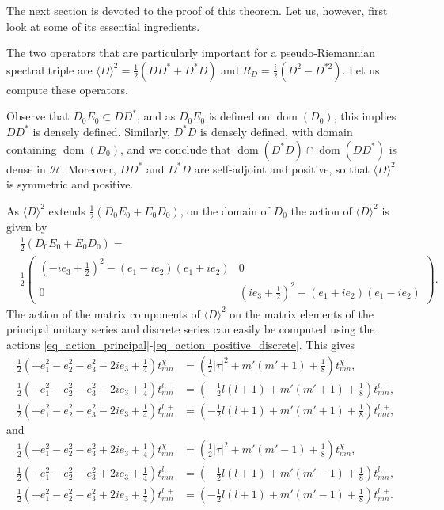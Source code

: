 \documentclass{amsart}
\theoremstyle{definition}
\theoremstyle{remark}
\DeclareMathOperator{\dom}{dom}
\numberwithin{equation}{section}
\begin{document}
The next section is devoted to the proof of this theorem. Let us, however, first look at some of its essential ingredients.

The two operators that are particularly important for a pseudo-Riemannian spectral triple are $\langle D\rangle^2=\tfrac{1}{2}(DD^*+D^*D)$ and $R_D=\tfrac{i}{2}(D^2-D^{*2})$. Let us compute these operators.

Observe that $D_0 E_0\subset DD^*$, and as $D_0E_0$ is defined on $\dom(D_0)$, this implies $DD^*$ is densely defined. Similarly, $D^*D$ is densely defined, with domain containing $\dom(D_0)$, and we conclude that $\dom(D^*D)\cap\dom(DD^*)$ is dense in $\mathcal{H}$. Moreover, $DD^*$ and $D^*D$ are self-adjoint and positive, so that $\langle D\rangle^2$ is symmetric and positive.

As $\langle D\rangle^2$ extends $\tfrac{1}{2}(D_0E_0+E_0D_0)$, on the domain of $D_0$ the action of $\langle D\rangle^2$ is given by
\begin{equation}
    \begin{aligned}
        &\tfrac{1}{2}(D_0E_0+E_0D_0)=\\
        &\frac{1}{2}\begin{pmatrix}
        (-ie_3+\tfrac{1}{2})^2-(e_1-ie_2)(e_1+ie_2) & 0 \\ 0 & (ie_3+\tfrac{1}{2})^2-(e_1+ie_2)(e_1-ie_2)
    \end{pmatrix}.
    \end{aligned}
\end{equation}
The action of the matrix components of $\langle D\rangle^2$ on the matrix elements of the principal unitary series and discrete series can easily be computed using the actions \eqref{eq_action_principal}-\eqref{eq_action_positive_discrete}. This gives
\begin{equation}\label{eq_action_first_component}
    \begin{aligned}
         \tfrac{1}{2}(-e_1^2-e_2^2-e_3^2-2ie_3+\tfrac{1}{4})t^\chi_{mn}&=(\tfrac{1}{2}|\tau|^2+m'(m'+1)+\tfrac{1}{8})t^\chi_{mn},\\
         \tfrac{1}{2}(-e_1^2-e_2^2-e_3^2-2ie_3+\tfrac{1}{4})t^{l,-}_{mn}&=(-\tfrac{1}{2}l(l+1)+m'(m'+1)+\tfrac{1}{8})t^{l,-}_{mn},\\
         \tfrac{1}{2}(-e_1^2-e_2^2-e_3^2-2ie_3+\tfrac{1}{4})t^{l,+}_{mn}&=(-\tfrac{1}{2}l(l+1)+m'(m'+1)+\tfrac{1}{8})t^{l,+}_{mn},
    \end{aligned}    
\end{equation}
and
\begin{equation}\label{eq_action_second_component}
    \begin{aligned}
         \tfrac{1}{2}(-e_1^2-e_2^2-e_3^2+2ie_3+\tfrac{1}{4})t^\chi_{mn}&=(\tfrac{1}{2}|\tau|^2+m'(m'-1)+\tfrac{1}{8})t^\chi_{mn},\\
         \tfrac{1}{2}(-e_1^2-e_2^2-e_3^2+2ie_3+\tfrac{1}{4})t^{l,-}_{mn}&=(-\tfrac{1}{2}l(l+1)+m'(m'-1)+\tfrac{1}{8})t^{l,-}_{mn},\\
         \tfrac{1}{2}(-e_1^2-e_2^2-e_3^2+2ie_3+\tfrac{1}{4})t^{l,+}_{mn}&=(-\tfrac{1}{2}l(l+1)+m'(m'-1)+\tfrac{1}{8})t^{l,+}_{mn}.
    \end{aligned}    
\end{equation}
\end{document}
